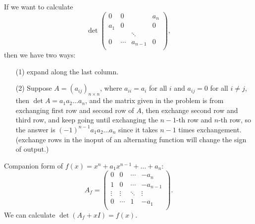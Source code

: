\begin{eg}
    If we want to calculate
    \[
        \det \begin{pmatrix}
            0 & 0 &  & a_n  \\
            a_1 & 0 &  &  0 \\
             &  & \ddots &   \\
            0 & \cdots & a_{n-1} & 0  \\
        \end{pmatrix},
    \] then we have two ways:
    \begin{itemize}
        \item [(1)] expand along the last column. 
        \item [(2)] Suppose \(A = (a_{ij})_{n \times n}\), where \(a_{ii} = a_i\) for all \(i\) and \(a_{ij} = 0\) for all \(i \neq j\), then \(\det A = a_1 a_2 \dots a_n\), and the matrix given in the problem is from exchanging first row and second row of \(A\), then exchange second row and third row, and keep going until exchanging the \(n-1\)-th row and \(n\)-th row, so the answer is \((-1)^{n-1}a_1 a_2 \dots a_n\) since it takes \(n-1\) times exchangement. (exchange rows in the inoput of an alternating function will change the sign of output.)         
    \end{itemize}
\end{eg}

\begin{eg}
    Companion form of \(f(x) = x^n + a_1 x^{n-1} + \dots + a_n\):
    \[
        A_f = \begin{pmatrix}
            0 & 0 & \cdots & -a_n  \\
            1 & 0 & \cdots & -a_{n-1}  \\
            \vdots & \vdots & \ddots &  \vdots \\
            0 & \cdots & 1 & -a_1  \\
        \end{pmatrix}.
    \] We can calculate \(\det (A_f + xI) = f(x)\). 
\end{eg}

